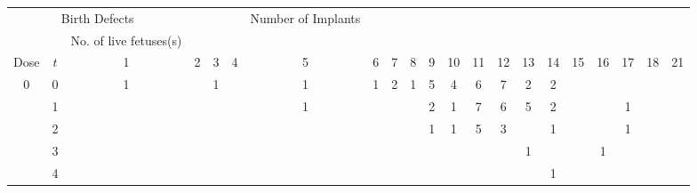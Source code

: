 \documentclass[12pt,oneside]{report}
\theoremstyle{definition}
\theoremstyle{mystyle}
\begin{document}
\begin{center}
	\tiny
	\begin{longtable}[h!]{c c c c c c c c c c c c c c c c c c c c c}
		\hline
		\multicolumn{3}{c}{Birth Defects}&  &&&{Number of Implants}\\
		\multicolumn{1}{r}{}
		&  \multicolumn{1}{c}{}
		& \multicolumn{1}{c}{No. of live fetuses(s)} \\
		\cline{3-21}
		Dose	    & $t$ & 1&2&3&4&5&6&7&8&9&10&11&12&13&14&15&16&17&18&21 \\
		\hline
		0& 0& 1&&1&&1&1&2&1&5&4&6&7&2 &2&&&&&     \\
		& 1        & &&&&1&&&&2&1&7&6&5  &2&&&1&&     \\
		& 2    &&&&&&&&&1&1&5&3&     &1&&&1&& \\
		&3     &  &&&&&&&&&&&&    1&&&1&&& \\
		& 4     &  &&&&&&&&&&&& &1&&&&&\\
		

\end{longtable}
\end{center}
\end{document}
